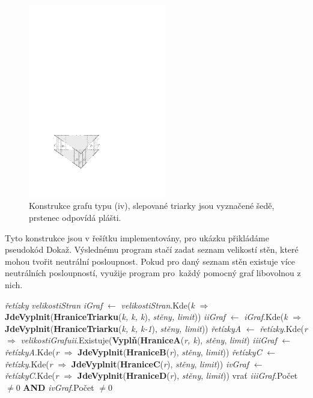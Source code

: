 \begin{figure}[h]\centering
\includegraphics[width = 60mm]{../img/iv-construction}
\caption{Konstrukce grafu typu (iv), slepované triarky jsou vyznačené šedě, prstenec odpovídá plášti.}
\label{obr03:konstrukceiv}
\end{figure}

Tyto konstrukce jsou v řešítku implementovány, pro ukázku přikládáme pseudokód Dokaž. Výslednému program stačí zadat seznam velikostí stěn, které mohou tvořit neutrální posloupnost. Pokud pro daný seznam stěn existuje více neutrálních posloupností, využije program pro~každý pomocný graf libovolnou z nich.


\begin{algorithm}
\label{alg:dokaz}
\begin{algorithmic}
\State \textit{řetízky} 
\State \textit{velikostiStran} 
\State 
\State \textit{iGraf} $\gets$ \textit{velikostiStran}.Kde(\textit{k} $\Rightarrow$ \textbf{JdeVyplnit}(\textbf{HraniceTriarku}(\textit{k, k, k}), \textit{stěny, limit}))
\State \textit{iiGraf} $\gets$ \textit{iGraf}.Kde(\textit{k} $\Rightarrow$ \textbf{JdeVyplnit}(\textbf{HraniceTriarku}(\textit{k, k, k-1}), \textit{stěny, limit}))
\State \textit{řetízkyA} $\gets$ \textit{řetízky}.Kde(\textit{r} $\Rightarrow$ \textit{velikostiGrafuii}.Existuje(\textbf{Vyplň}(\textbf{HraniceA}(\textit{r, k}), \textit{stěny}, \textit{limit})
\State \textit{iiiGraf} $\gets$ \textit{řetízkyA}.Kde(\textit{r} $\Rightarrow$ \textbf{JdeVyplnit}(\textbf{HraniceB}(\textit{r}), \textit{stěny}, \textit{limit}))
\State \textit{řetízkyC} $\gets$ \textit{řetízky}.Kde(\textit{r} $\Rightarrow$ \textbf{JdeVyplnit}(\textbf{HraniceC}(\textit{r}), \textit{stěny}, \textit{limit}))
\State \textit{ivGraf} $\gets$ \textit{řetízkyC}.Kde(\textit{r} $\Rightarrow$ \textbf{JdeVyplnit}(\textbf{HraniceD}(\textit{r}), \textit{stěny}, \textit{limit}))
\State 
\State vrať \textit{iiiGraf}.Počet $ \neq 0$ \textbf{AND} \textit{ivGraf}.Počet $\neq 0$

\EndProcedure

\end{algorithmic}
\end{algorithm}


